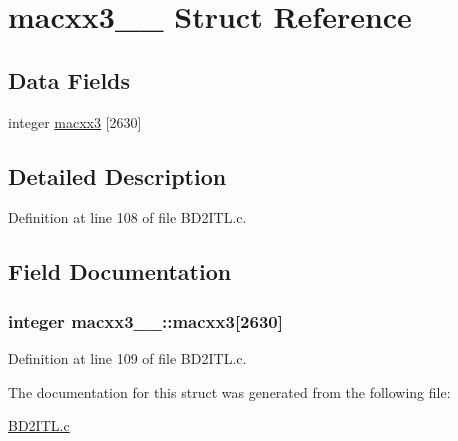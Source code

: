 \hypertarget{structmacxx3__1__}{}\section{macxx3\+\_\+\_\+ Struct Reference}
\label{structmacxx3__1__}
\subsection*{Data Fields}
\begin{DoxyCompactItemize}
\item 
integer \hyperlink{structmacxx3__1___a7864fcfd5f7dfc41c569d76390a96d05}{macxx3} \mbox{[}2630\mbox{]}
\end{DoxyCompactItemize}


\subsection{Detailed Description}


Definition at line 108 of file B\+D2\+I\+T\+L.\+c.



\subsection{Field Documentation}
\subsubsection[{\texorpdfstring{macxx3}{macxx3}}]{\setlength{\rightskip}{0pt plus 5cm}integer macxx3\+\_\+\_\+\+::macxx3\mbox{[}2630\mbox{]}}\hypertarget{structmacxx3__1___a7864fcfd5f7dfc41c569d76390a96d05}{}\label{structmacxx3__1___a7864fcfd5f7dfc41c569d76390a96d05}


Definition at line 109 of file B\+D2\+I\+T\+L.\+c.



The documentation for this struct was generated from the following file\+:\begin{DoxyCompactItemize}
\item 
\hyperlink{BD2ITL_8c}{B\+D2\+I\+T\+L.\+c}\end{DoxyCompactItemize}
